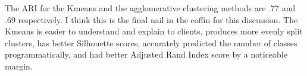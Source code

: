 \documentclass[12pt]{article}
\begin{document}
The ARI for the Kmeans and the agglomerative clustering methods are .77 and .69 respectively. I think this is the final 
nail in the coffin for this discussion. The Kmeans is easier to understand and explain to clients, produces more evenly 
split clusters, has better Silhouette scores, accurately predicted the number of classes programmatically, and had 
better Adjusted Rand Index score by a noticeable margin. 
\end{document}

